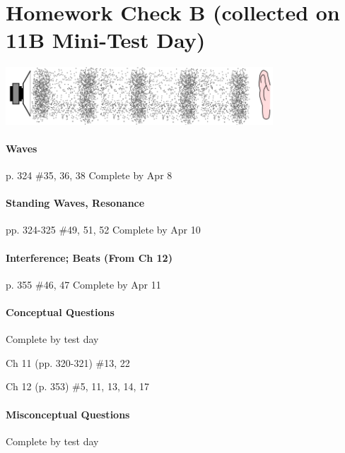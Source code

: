 \documentclass[10pt]{exam}
\begin{document}

\pagebreak

\section*{Homework Check B (collected on 11B Mini-Test Day)}

\begin{center}
  \includegraphics[width=10cm]{sound-wave.png}
\end{center}

\paragraph{Waves} p. 324 \#35, 36, 38
\dotfill Complete by Apr 8



\paragraph{Standing Waves, Resonance} pp. 324-325 \#49, 51, 52
\dotfill Complete by Apr 10



\paragraph{Interference; Beats (From Ch 12)} p. 355  \#46, 47
\dotfill Complete by Apr 11




\paragraph{Conceptual Questions}
\dotfill Complete by test day
   

Ch 11 (pp. 320-321) \#13, 22

Ch 12 (p. 353) \#5, 11, 13, 14, 17



\paragraph{Misconceptual Questions}
\dotfill Complete by test day
\end{document}
